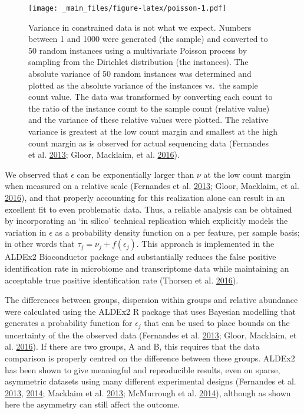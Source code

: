 \documentclass[onecolumn]{book}
\theoremstyle{definition}
\theoremstyle{definition}
\theoremstyle{definition}
\theoremstyle{remark}
\begin{document}
\begin{figure}
\centering
\texttt{[image: \_main\_files/figure-latex/poisson-1.pdf]}
\caption{\label{fig:poisson}Variance in constrained data is not what we
expect. Numbers between 1 and 1000 were generated (the sample) and
converted to 50 random instances using a multivariate Poisson process by
sampling from the Dirichlet distribution (the instances). The absolute
variance of 50 random instances was determined and plotted as the
absolute variance of the instances vs.~the sample count value. The data
was transformed by converting each count to the ratio of the instance
count to the sample count (relative value) and the variance of these
relative values were plotted. The relative variance is greatest at the
low count margin and smallest at the high count margin as is observed
for actual sequencing data (Fernandes et al.
\protect\hyperlink{ref-fernandes:2013}{2013}; Gloor, Macklaim, et al.
\protect\hyperlink{ref-gloorAJS:2016}{2016}).}
\end{figure}

We observed that \(\epsilon\) can be exponentially larger than \(\nu\)
at the low count margin when measured on a relative scale (Fernandes et
al. \protect\hyperlink{ref-fernandes:2013}{2013}; Gloor, Macklaim, et
al. \protect\hyperlink{ref-gloorAJS:2016}{2016}), and that properly
accounting for this realization alone can result in an excellent fit to
even problematic data. Thus, a reliable analysis can be obtained by
incorporating an `in silico' technical replication which explicitly
models the variation in \(\epsilon\) as a probability density function
on a per feature, per sample basis; in other words that
\(\tau_{j} = \nu_j + f(\epsilon_{j})\). This approach is implemented in
the ALDEx2 Bioconductor package and substantially reduces the false
positive identification rate in microbiome and transcriptome data while
maintaining an acceptable true positive identification rate (Thorsen et
al. \protect\hyperlink{ref-Thorsen:2016aa}{2016}).

The differences between groups, dispersion within groups and relative
abundance were calculated using the ALDEx2 R package that uses Bayesian
modelling that generates a probability function for \(\epsilon_j\) that
can be used to place bounds on the uncertainty of the the observed data
(Fernandes et al. \protect\hyperlink{ref-fernandes:2013}{2013}; Gloor,
Macklaim, et al. \protect\hyperlink{ref-gloorAJS:2016}{2016}). If there
are two groups, A and B, this requires that the data comparison is
properly centred on the difference between these groups. ALDEx2 has been
shown to give meaningful and reproducible results, even on sparse,
asymmetric datasets using many different experimental designs (Fernandes
et al. \protect\hyperlink{ref-fernandes:2013}{2013},
\protect\hyperlink{ref-fernandes:2014}{2014}; Macklaim et al.
\protect\hyperlink{ref-macklaim:2013}{2013}; McMurrough et al.
\protect\hyperlink{ref-mcmurrough:2014}{2014}), although as shown here
the asymmetry can still affect the outcome.
\end{document}
